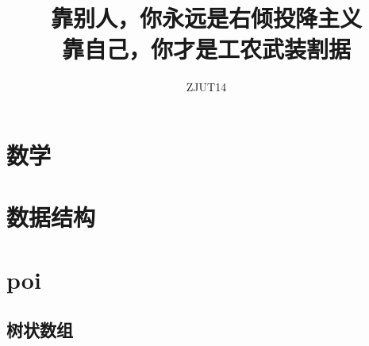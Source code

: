 \documentclass{article}
\title{靠别人，你永远是右倾投降主义\\靠自己，你才是工农武装割据}
\author{ZJUT14}
\begin{document}
\begin{titlepage}
\maketitle
\thispagestyle{empty}
\pagebreak
\pagestyle{plain}
\tableofcontents
\end{titlepage}



\section{数学}
\section{数据结构}
\section{poi}
\subsection{树状数组}
\end{document}
